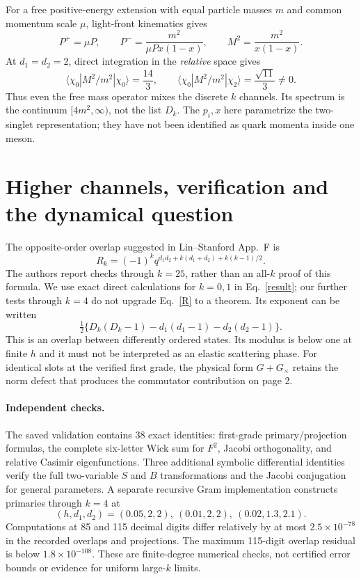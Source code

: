 \documentclass[11pt,a4paper]{article}
\begin{document}
For a free positive-energy extension with equal particle masses $m$
and common momentum scale $\mu$, light-front kinematics gives
\begin{equation}
 P^+=\mu P,\qquad P^-=\frac{m^2}{\mu P x(1-x)},\qquad
 M^2=\frac{m^2}{x(1-x)}.
\end{equation}
At $d_1=d_2=2$, direct integration in the \emph{relative} space gives
\begin{equation}
 \langle\chi_0|M^2/m^2|\chi_0\rangle=\frac{14}{3},\qquad
 \boxed{\langle\chi_0|M^2/m^2|\chi_2\rangle=\frac{\sqrt{11}}3\ne0.}
\end{equation}
Thus even the free mass operator mixes the discrete $k$ channels.
Its spectrum is the continuum $[4m^2,\infty)$, not the list $D_k$.
The $p_i,x$ here parametrize the two-singlet representation; they
have not been identified as quark momenta inside one meson.

\newpage
\section{Higher channels, verification and the dynamical question}
The opposite-order overlap suggested in Lin--Stanford App.~F is
\begin{equation}
 R_k=(-1)^k q^{d_1d_2+k(d_1+d_2)+k(k-1)/2}.
 \label{R}
\end{equation}
The authors report checks through $k=25$, rather than an all-$k$
proof of this formula. We use exact direct calculations for $k=0,1$
in Eq.~\eqref{result}; our further tests through $k=4$ do not upgrade
Eq.~\eqref{R} to a theorem. Its exponent can be written
\begin{equation}
 \tfrac12\{D_k(D_k-1)-d_1(d_1-1)-d_2(d_2-1)\}.
\end{equation}
This is an overlap between differently ordered states. Its modulus
is below one at finite $h$ and it must not be interpreted as an
elastic scattering phase. For identical slots at the verified first
grade, the physical form $G+G_\times$ retains the norm defect that
produces the commutator contribution on page 2.

\paragraph{Independent checks.}
The saved validation contains 38 exact identities: first-grade
primary/projection formulas, the complete six-letter Wick sum for
$F^2$, Jacobi orthogonality, and relative Casimir eigenfunctions.
Three additional symbolic differential identities verify the full
two-variable $S$ and $B$ transformations and the Jacobi conjugation
for general parameters. A separate recursive Gram implementation
constructs primaries through $k=4$ at
\begin{equation}
 (h,d_1,d_2)=(0.05,2,2),\ (0.01,2,2),\ (0.02,1.3,2.1).
\end{equation}
Computations at 85 and 115 decimal digits differ relatively by at
most $2.5\times10^{-78}$ in the recorded overlaps and projections.
The maximum 115-digit overlap residual is below $1.8\times10^{-108}$.
These are finite-degree numerical checks, not certified error bounds
or evidence for uniform large-$k$ limits.
\end{document}
